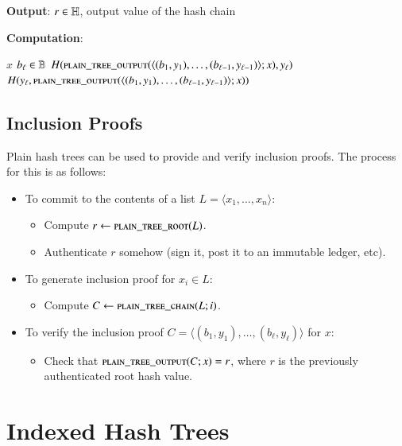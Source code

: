 \textbf{Output}:
$r \in \mathbb{H}$, output value of the hash chain

\textbf{Computation}:
\begin{algorithmic}
		 
			\State \Return $x$
		\Else
			\State \Assert $b_\ell \in \mathbb{B}$
				\State \Return $H(\Call{plain\_tree\_output}{\langle (b_1, y_1), \ldots, (b_{\ell-1}, y_{\ell-1}) \rangle; x}, y_\ell)$
			\Else
				\State \Return $H(y_\ell, \Call{plain\_tree\_output}{\langle (b_1, y_1), \ldots, (b_{\ell-1}, y_{\ell-1}) \rangle; x})$
			\EndIf
		\EndIf
	\EndFunction
\end{algorithmic}

\subsection{Inclusion Proofs}

Plain hash trees can be used to provide and verify inclusion proofs. The process for this is as follows:

\begin{itemize}
	\item To commit to the contents of a list $L = \langle x_1, \ldots, x_n \rangle$:
		\begin{itemize}
			\item Compute $r \gets \Call{plain\_tree\_root}{L}$.
			\item Authenticate $r$ somehow (sign it, post it to an immutable ledger, etc).
		\end{itemize}
	\item To generate inclusion proof for $x_i \in L$:
		\begin{itemize}
			\item Compute $C \gets \Call{plain\_tree\_chain}{L; i}$.
		\end{itemize}
	\item To verify the inclusion proof $C = \langle (b_1, y_1), \ldots, (b_\ell, y_\ell) \rangle$ for $x$:
		\begin{itemize}
			\item Check that $\Call{plain\_tree\_output}{C; x} = r$, where $r$ is the previously authenticated root hash value.
		\end{itemize}
\end{itemize}

\section{Indexed Hash Trees}

